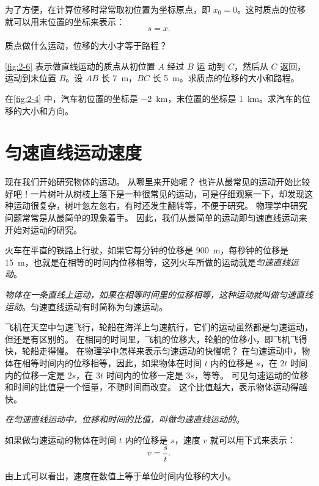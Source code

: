 为了方便，在计算位移时常常取初位置为坐标原点，即 $x_0=0$。这时质点的位移就可以用末位置的坐标来表示：
\[s=x.\]

\begin{Practice}
\begin{question}
  \item 质点做什么运动，位移的大小才等于路程？
  \item \cref{fig:2-6} 表示做直线运动的质点从初位置 $A$ 经过 $B$ 运
  动到 $C$，然后从 $C$ 返回，运动到末位置 $B$。设 $AB$ 长 \qty{7}{m}，$BC$ 长
  \qty{5}{m}。求质点的位移的大小和路程。
  \item 在\cref{fig:2-4} 中，汽车初位置的坐标是 \qty{-2}{km}，末位置的坐标是 \qty{1}{km}。求汽车的位移的大小和方向。
\end{question}
\end{Practice}


\section{匀速直线运动\texorpdfstring{\quad}{ }速度}
现在我们开始研究物体的运动。
从哪里来开始呢？
也许从最常见的运动开始比较好吧！一片树叶从树枝上落下是一种很常见的运动，可是仔细观察一下，却发现这种运动很复杂，树叶忽左忽右，有时还发生翻转等，不便于研究。
物理学中研究问题常常是从最简单的现象着手。
因此，我们从最简单的运动即匀速直线运动来开始对运动的研究。

火车在平直的铁路上行驶，如果它每分钟的位移是 \qty{900}{m}，每秒钟的位移是 \qty{15}{m}，也就是在相等的时间内位移相等，这列火车所做的运动就是\emph{匀速直线运动}。

\emph{物体在一条直线上运动，如果在相等时间里的位移相等，这种运动就叫做匀速直线运动}。匀速直线运动有时简称为匀速运动。

飞机在天空中匀速飞行，轮船在海洋上匀速航行，它们的运动虽然都是匀速运动，但还是有区别的。
在相同的时间里，飞机的位移大，轮船的位移小，即飞机飞得快，轮船走得慢。
在物理学中怎样来表示匀速运动的快慢呢？
在匀速运动中，物体在相等时间内的位移相等，因此，如果物体在时间 $t$ 内的位移是 $s$，在 $2t$ 时间内的位移一定是 $2s$，在 $3t$ 时间内的位移一定是 $3s$，等等。
可见匀速运动的位移和时间的比值是一个恒量，不随时间而改变。
这个比值越大，表示物体运动得越快。

\emph{在匀速直线运动中，位移和时间的比值，叫做匀速直线运动的}。

如果做匀速运动的物体在时间 $t$ 内的位移是 $s$，速度 $v$ 就可以用下式来表示：
\[v=\frac{s}{t}.\]

由上式可以看出，速度在数值上等于单位时间内位移的大小。

